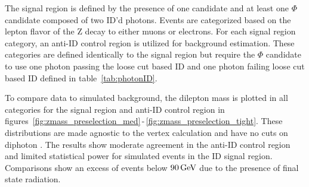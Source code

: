 The signal region is defined by the presence of one \PZ candidate and at least one $\Phi$ candidate composed of two ID'd photons. Events are categorized based on the lepton flavor of the Z decay to either muons or electrons. For each signal region category, an anti-ID control region is utilized for background estimation. These categories are defined identically to the signal region but require the $\Phi$ candidate to use one photon passing the loose cut based ID and one photon failing loose cut based ID defined in table~\ref{tab:photonID}.

To compare data to simulated background, the dilepton mass \mll is plotted in all categories for the signal region and anti-ID control region in figures~\ref{fig:zmass_preselection_med}$\,$-$\,$\ref{fig:zmass_preselection_tight}. These distributions are made agnostic to the vertex calculation and have no cuts on diphoton \lxy. The results show moderate agreement in the anti-ID control region and limited statistical power for simulated events in the ID signal region. Comparisons show an excess of events below $90\,\text{Ge\hspace{-.08em}V}$ due to the presence of final state radiation.

